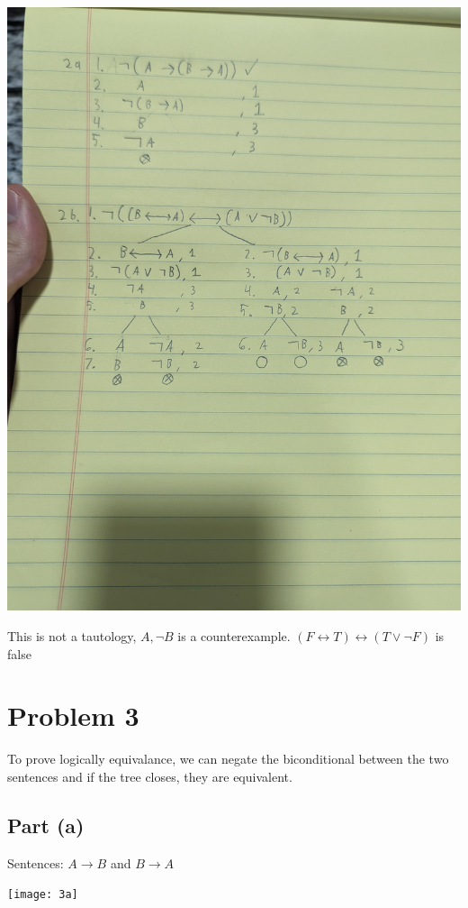 \documentclass[12pt]{article}
\begin{document}
\includegraphics[width=\textwidth]{2b}


This is not a tautology, $A, \lnot B$ is a counterexample. $(F \leftrightarrow T) \leftrightarrow (T \lor \lnot F)$ is false


\section*{Problem 3}

To prove logically equivalance, we can negate the biconditional between the two sentences and if the tree closes, they are equivalent. 

\subsection*{Part (a)}

Sentences: $A \rightarrow B$ and $B \rightarrow A$

\texttt{[image: 3a]}
\end{document}
